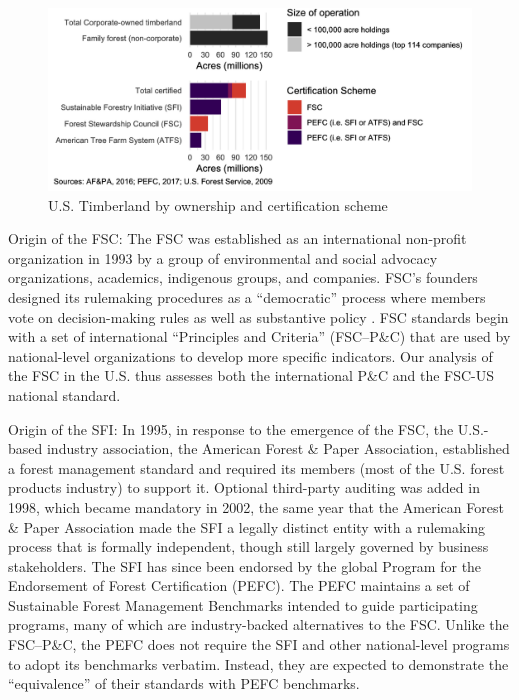 \documentclass[
      12pt,
            Review ]{article}
\begin{document}
\begin{figure}
\centering
\includegraphics{Figs/acres-1.png}
\caption{U.S. Timberland by ownership and certification scheme}
\end{figure}

Origin of the FSC: The FSC was established as an international
non-profit organization in 1993 by a group of environmental and social
advocacy organizations, academics, indigenous groups, and companies.
FSC's founders designed its rulemaking procedures as a ``democratic''
process where members vote on decision-making rules as well as
substantive policy \citep{Meidinger2003}. FSC standards begin with a set
of international ``Principles and Criteria'' (FSC--P\&C) that are used
by national-level organizations to develop more specific indicators. Our
analysis of the FSC in the U.S. thus assesses both the international
P\&C and the FSC-US national standard.

Origin of the SFI: In 1995, in response to the emergence of the FSC, the
U.S.-based industry association, the American Forest \& Paper
Association, established a forest management standard and required its
members (most of the U.S. forest products industry) to support it.
Optional third-party auditing was added in 1998, which became mandatory
in 2002, the same year that the American Forest \& Paper Association
made the SFI a legally distinct entity with a rulemaking process that is
formally independent, though still largely governed by business
stakeholders. The SFI has since been endorsed by the global Program for
the Endorsement of Forest Certification (PEFC). The PEFC maintains a set
of Sustainable Forest Management Benchmarks intended to guide
participating programs, many of which are industry-backed alternatives
to the FSC. Unlike the FSC--P\&C, the PEFC does not require the SFI and
other national-level programs to adopt its benchmarks verbatim. Instead,
they are expected to demonstrate the ``equivalence'' of their standards
with PEFC benchmarks.
\end{document}

